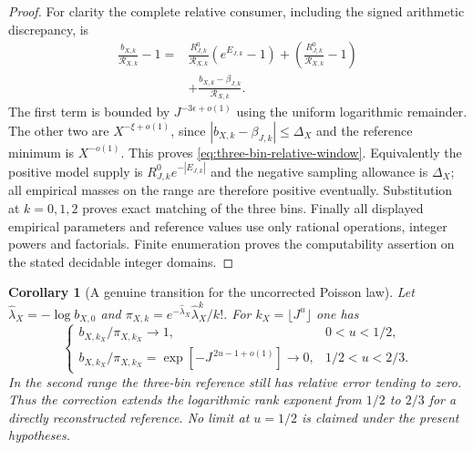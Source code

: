 \documentclass[11pt]{article}
\newtheorem{corollary}[theorem]{Corollary}
\theoremstyle{definition}
\begin{document}
\begin{proof}
For clarity the complete relative consumer, including the signed
arithmetic discrepancy, is
\begin{equation}
 \begin{aligned}
 \frac{b_{X,k}}{\mathcal R_{X,k}}-1
  ={}&\frac{R^0_{J,k}}{\mathcal R_{X,k}}(e^{E_{J,k}}-1)
       +\left(\frac{R^0_{J,k}}{\mathcal R_{X,k}}-1\right)\\
     &+\frac{b_{X,k}-\beta_{J,k}}{\mathcal R_{X,k}} .
 \end{aligned}
 \label{eq:three-bin-full-relative-consumer}
\end{equation}
The first term is bounded by
$J^{-3\epsilon+o(1)}$ using the uniform logarithmic remainder.
The other two are $X^{-\xi+o(1)}$, since
$|b_{X,k}-\beta_{J,k}|\le\Delta_X$ and the reference minimum
is $X^{-o(1)}$.
This proves \eqref{eq:three-bin-relative-window}.
Equivalently the positive model supply is
$R^0_{J,k}e^{-|E_{J,k}|}$ and the negative sampling allowance
is $\Delta_X$; all empirical masses on the range are
therefore positive eventually.
Substitution at $k=0,1,2$ proves exact matching of the three bins.
Finally all displayed empirical parameters and reference values
use only rational operations, integer powers and factorials.
Finite enumeration proves the computability assertion on the
stated decidable integer domains.
\end{proof}

\begin{corollary}[A genuine transition for the uncorrected Poisson law]
\label{cor:three-bin-poisson-transition}
Let $\widehat\lambda_X=-\log b_{X,0}$ and
$\pi_{X,k}=e^{-\widehat\lambda_X}\widehat\lambda_X^k/k!$.
For $k_X=\lfloor J^u\rfloor$ one has
\begin{equation}
 \begin{cases}
 b_{X,k_X}/\pi_{X,k_X}\longrightarrow1,
                         &0<u<1/2,\\
 b_{X,k_X}/\pi_{X,k_X}
        =\exp[-J^{\,2u-1+o(1)}]\longrightarrow0,
                         &1/2<u<2/3 .
 \end{cases}
 \label{eq:three-bin-poisson-transition}
\end{equation}
In the second range the three-bin reference still has relative
error tending to zero.
Thus the correction extends the logarithmic rank exponent
from $1/2$ to $2/3$ for a directly reconstructed reference.
No limit at $u=1/2$ is claimed under the present hypotheses.
\end{corollary}
\end{document}
